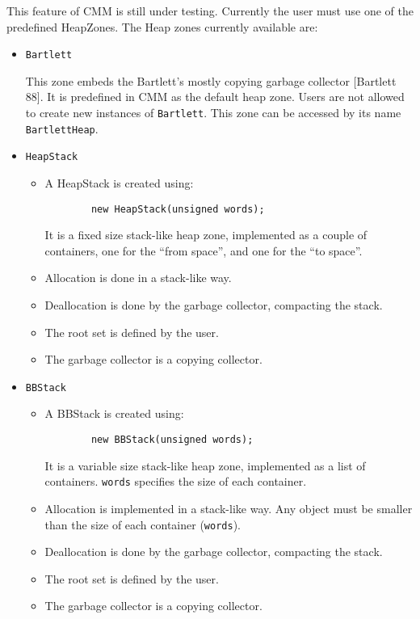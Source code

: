 This feature of CMM is still under testing. Currently the user must
use one of the predefined HeapZones. The Heap zones currently available
are:

\begin{itemize}
\item{\verb|Bartlett|}

This zone embeds the Bartlett's mostly copying garbage collector [Bartlett 88].
It is predefined in CMM as the default heap zone.
Users are not allowed to create new instances of \verb|Bartlett|.
This zone can be accessed by its name {\tt BartlettHeap}.

\item{\verb|HeapStack|}
\begin{itemize}

\item A HeapStack is created using:
\begin{verbatim}
		new HeapStack(unsigned words);
\end{verbatim}
It is a fixed size stack-like heap zone, implemented as a couple of
containers, one for the ``from space'', and one for the ``to space''.

\item Allocation is done in a stack-like way.

\item Deallocation is done by the garbage collector, compacting the stack.

\item The root set is defined by the user.

\item The garbage collector is a copying collector.
\end{itemize}

\item{\verb|BBStack|}
\begin{itemize}

\item A BBStack is created using:
\begin{verbatim}
		new BBStack(unsigned words);
\end{verbatim}
It is a variable size stack-like heap zone, implemented as a list of
containers. \verb|words| specifies the size of each container.

\item Allocation is implemented in a stack-like way. Any object must be smaller
than the size of each container (\verb|words|).

\item Deallocation is done by the garbage collector, compacting the stack.

\item The root set is defined by the user.

\item The garbage collector is a copying collector.
\end{itemize}

\end{itemize}

